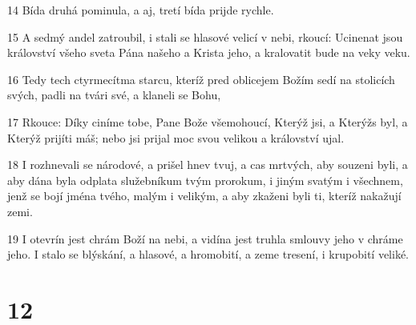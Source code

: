 \par 14 Bída druhá pominula, a aj, tretí bída prijde rychle.
\par 15 A sedmý andel zatroubil, i stali se hlasové velicí v nebi, rkoucí: Ucinenat jsou království všeho sveta Pána našeho a Krista jeho, a kralovatit bude na veky veku.
\par 16 Tedy tech ctyrmecítma starcu, kteríž pred oblicejem Božím sedí na stolicích svých, padli na tvári své, a klaneli se Bohu,
\par 17 Rkouce: Díky ciníme tobe, Pane Bože všemohoucí, Kterýž jsi, a Kterýžs byl, a Kterýž prijíti máš; nebo jsi prijal moc svou velikou a království ujal.
\par 18 I rozhnevali se národové, a prišel hnev tvuj, a cas mrtvých, aby souzeni byli, a aby dána byla odplata služebníkum tvým prorokum, i jiným svatým i všechnem, jenž se bojí jména tvého, malým i velikým, a aby zkaženi byli ti, kteríž nakažují zemi.
\par 19 I otevrín jest chrám Boží na nebi, a vidína jest truhla smlouvy jeho v chráme jeho. I stalo se blýskání, a hlasové, a hromobití, a zeme tresení, i krupobití veliké.

\chapter{12}

